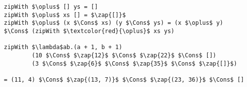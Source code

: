 \begin{frame}[fragile]


\begin{lstlisting}[mathescape=true,numbers=none]
zipWith $\oplus$ [] ys = []
zipWith $\oplus$ xs [] = $\zap{[]}$
zipWith $\oplus$ (x $\Cons$ xs) (y $\Cons$ ys) = (x $\oplus$ y) $\Cons$ (zipWith $\textcolor{red}{\oplus}$ xs ys)

zipWith $\lambda$ab.(a + 1, b + 1)
        (10 $\Cons$ $\zap{12}$ $\Cons$ $\zap{22}$ $\Cons$ [])
        (3 $\Cons$ $\zap{6}$ $\Cons$ $\zap{35}$ $\Cons$ $\zap{[]}$)

= (11, 4) $\Cons$ $\zap{(13, 7)}$ $\Cons$ $\zap{(23, 36)}$ $\Cons$ []
\end{lstlisting}

\end{frame}
